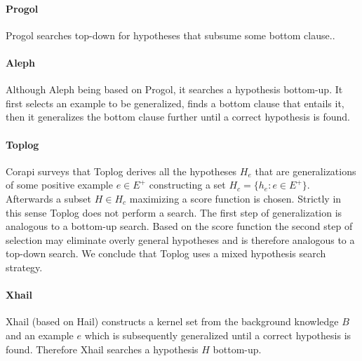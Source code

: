\begin{center}
\end{center}

\paragraph{Progol}
Progol searches top-down for hypotheses that subsume some bottom clause.\cite{nienhuys1997foundations}.
\paragraph{Aleph\cite{aleph2007}}
Although Aleph being based on Progol, it searches a hypothesis bottom-up. It first selects an example to be generalized, finds a bottom clause that entails it, then it generalizes the bottom clause further until a correct hypothesis is found.
\paragraph{Toplog\cite{muggleton2008toplog}}
Corapi\cite{corapi2011nonmonotonic} surveys that Toplog derives all the hypotheses $H_e$ that are generalizations of some positive example $e \in E^+$ constructing a set $H_c=\{h_e:e \in E^+\}$.
Afterwards a subset $H \in H_c$ maximizing a score function is chosen. Strictly in this sense Toplog does not perform a search. The first step of generalization is analogous to a bottom-up search. Based on the score function the second step of selection may eliminate overly general hypotheses and is therefore analogous to a top-down search. We conclude that Toplog uses a mixed hypothesis search strategy.
\paragraph{Xhail\cite{ray2003hybrid}}
Xhail (based on Hail) constructs a kernel set from the background knowledge $B$ and an example $e$ which is subsequently generalized until a correct hypothesis is found. Therefore Xhail searches a hypothesis $H$ bottom-up.

